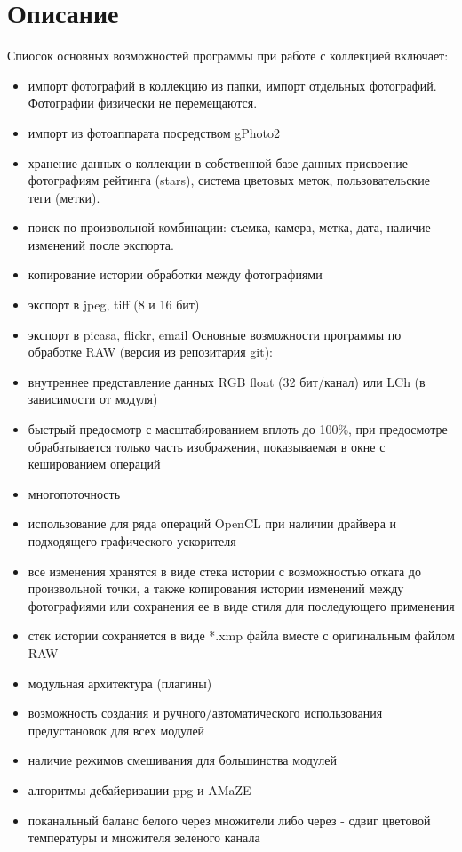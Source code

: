 \documentclass[10pt, a5paper]{article}
\begin{document}
\section*{Описание}
Спиосок основных возможностей программы при работе с коллекцией включает:
\begin{itemize}
\item импорт фотографий в коллекцию из папки, импорт отдельных фотографий. Фотографии физически не перемещаются.
\item импорт из фотоаппарата посредством gPhoto2
\item хранение данных о коллекции в собственной базе данных
присвоение фотографиям рейтинга (stars), система цветовых меток, пользовательские теги (метки).
\item поиск по произвольной комбинации: съемка, камера, метка, дата, наличие изменений после экспорта.
\item копирование истории обработки между фотографиями
\item экспорт в jpeg, tiff (8 и 16 бит) 
\item экспорт в picasa, flickr, email
Основные возможности программы по обработке RAW (версия из репозитария git):
\item внутреннее представление данных RGB float (32 бит/канал) или LCh (в зависимости от модуля)
\item быстрый предосмотр с масштабированием вплоть до 100\%, при предосмотре обрабатывается только часть изображения, показываемая в окне с кешированием операций
\item многопоточность
\item использование для ряда операций OpenCL при наличии драйвера и подходящего графического ускорителя
\item все изменения хранятся в виде стека истории с возможностью отката до произвольной точки, а также копирования истории изменений между фотографиями или сохранения ее в виде стиля для последующего применения
\item стек истории сохраняется в виде *.xmp файла вместе с оригинальным файлом RAW
\item модульная архитектура (плагины)
\item возможность создания и ручного/автоматического использования предустановок для всех модулей
\item наличие режимов смешивания для большинства модулей
\item алгоритмы дебайеризации ppg и AMaZE 
\item поканальный баланс белого через множители либо через  - сдвиг цветовой температуры и множителя зеленого канала

\end{itemize}
\end{document}
